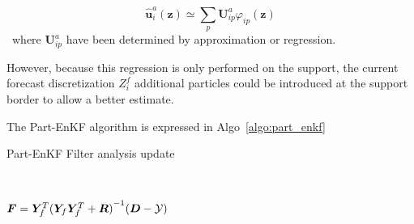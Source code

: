 \begin{equation*}
    \hat{\bm u}^a_i(\bm z) \simeq \sum_p \bm U^a_{ip} \varphi_{ip}(\bm z)
\end{equation*}~where $\bm U^a_{ip}$ have been determined by approximation or regression.


However, because this regression is only performed on the support, the current forecast discretization $Z^f_i$ additional particles could be introduced at the support border to allow a better estimate.

The Part-EnKF algorithm is expressed in Algo~\ref{algo:part_enkf}
\begin{algorithm}
    \caption{Part-EnKF Filter analysis update}~\label{algo:part_enkf}

    $ \bm{F} = \bm Y_f^T {(\bm Y_f \bm Y_f^T + \bm R)}^{-1}(\bm{D} - \mathcal{Y})$ 
\end{algorithm}

